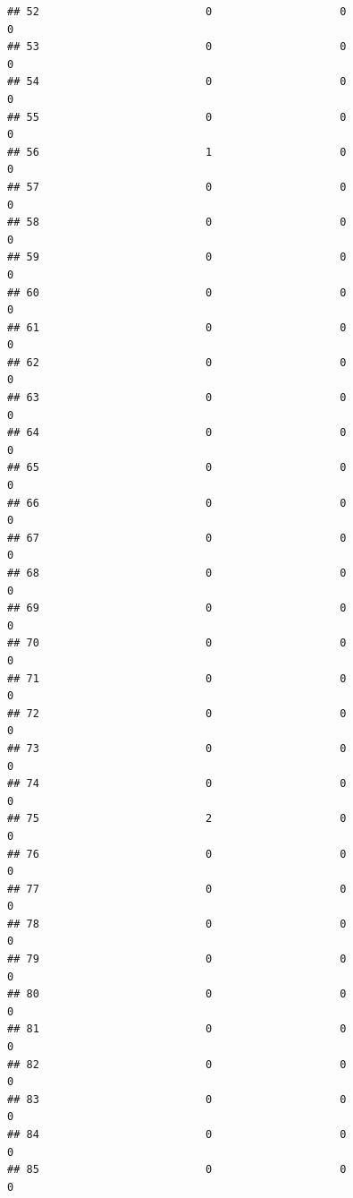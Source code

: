 \documentclass[
]{article}
\begin{document}
\begin{verbatim}
## 52                          0                    0                      0
## 53                          0                    0                      0
## 54                          0                    0                      0
## 55                          0                    0                      0
## 56                          1                    0                      0
## 57                          0                    0                      0
## 58                          0                    0                      0
## 59                          0                    0                      0
## 60                          0                    0                      0
## 61                          0                    0                      0
## 62                          0                    0                      0
## 63                          0                    0                      0
## 64                          0                    0                      0
## 65                          0                    0                      0
## 66                          0                    0                      0
## 67                          0                    0                      0
## 68                          0                    0                      0
## 69                          0                    0                      0
## 70                          0                    0                      0
## 71                          0                    0                      0
## 72                          0                    0                      0
## 73                          0                    0                      0
## 74                          0                    0                      0
## 75                          2                    0                      0
## 76                          0                    0                      0
## 77                          0                    0                      0
## 78                          0                    0                      0
## 79                          0                    0                      0
## 80                          0                    0                      0
## 81                          0                    0                      0
## 82                          0                    0                      0
## 83                          0                    0                      0
## 84                          0                    0                      0
## 85                          0                    0                      0

\end{verbatim}
\end{document}
